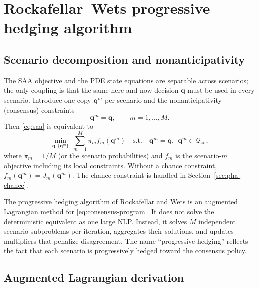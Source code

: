 \documentclass[11pt]{article}
\numberwithin{equation}{section}
\newcommand{\qq}{\mathbf{q}}
\theoremstyle{plain}
\begin{document}
\section{Rockafellar--Wets progressive hedging algorithm}
\label{sec:pha}

\subsection{Scenario decomposition and nonanticipativity}

The SAA objective and the PDE state equations are separable across scenarios;
the only coupling is that the same here-and-now decision $\qq$ must be used in
every scenario.  Introduce one copy $\qq^m$ per scenario and the
nonanticipativity (consensus) constraints
\begin{equation}
\label{eq:consensus}
\qq^m=\qq,\qquad m=1,\dots,M.
\end{equation}
Then \eqref{eq:saa} is equivalent to
\begin{equation}
\label{eq:consensus-program}
\min_{\qq,\{\qq^m\}}\ \sum_{m=1}^{M}\pi_m f_m(\qq^m)
\quad\text{s.t.}\quad
\qq^m=\qq,\ \ \qq^m\in\mathcal{Q}_{\mathrm{ad}},
\end{equation}
where $\pi_m=1/M$ (or the scenario probabilities) and $f_m$ is the
scenario-$m$ objective including its local constraints.  Without a chance
constraint, $f_m(\qq^m)=J_m(\qq^m)$.  The chance constraint is handled in
Section~\ref{sec:pha-chance}.

The progressive hedging algorithm of Rockafellar and Wets
\citep{rockafellar1991} is an augmented Lagrangian method for
\eqref{eq:consensus-program}.  It does not solve the deterministic equivalent
as one large NLP.  Instead, it solves $M$ independent scenario subproblems per
iteration, aggregates their solutions, and updates multipliers that penalize
disagreement.  The name ``progressive hedging'' reflects the fact that each
scenario is progressively hedged toward the consensus policy.

\subsection{Augmented Lagrangian derivation}
\end{document}

